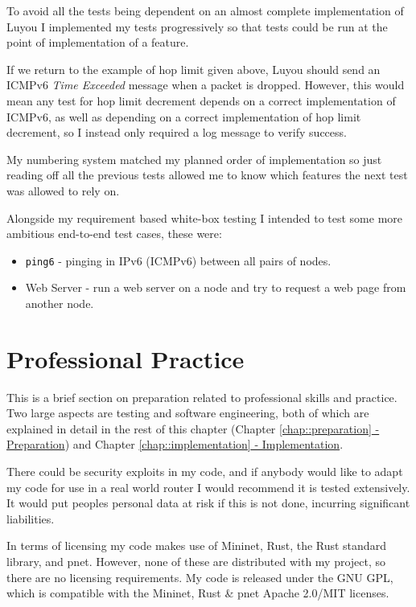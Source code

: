\documentclass[12pt,a4paper,twoside,openany]{report}
\begin{document}
\bigskip

To avoid all the tests being dependent on an almost complete implementation of Luyou I implemented my tests progressively so that tests could be run at the point of implementation of a feature. 

If we return to the example of hop limit given above, Luyou should send an ICMPv6 \textit{Time Exceeded} message when a packet is dropped.  However, this would mean any test for hop limit decrement depends on a correct implementation of ICMPv6, as well as depending on a correct implementation of hop limit decrement, so I instead only required a log message to verify success.  

My numbering system matched my planned order of implementation so just reading off all the previous tests allowed me to know which features the next test was allowed to rely on.  

\bigskip

Alongside my requirement based white-box testing I intended to test some more ambitious end-to-end test cases, these were:
\begin{itemize}
\item \verb!ping6! - pinging in IPv6 (ICMPv6) between all pairs of nodes.
\item Web Server - run a web server on a node and try to request a web page from another node.
\end{itemize}

\section{Professional Practice}
This is a brief section on preparation related to professional skills and practice.  Two large aspects are testing and software engineering, both of which are explained in detail in the rest of this chapter (Chapter \ref{chap::preparation}\hyperref[chap::preparation]{ - Preparation}) and Chapter \ref{chap::implementation}\hyperref[chap::implementation]{ - Implementation}.  

\bigskip

There could be security exploits in my code, and if anybody would like to adapt my code for use in a real world router I would recommend it is tested extensively.  It would put peoples personal data at risk if this is not done, incurring significant liabilities.

\bigskip

In terms of licensing my code makes use of Mininet, Rust, the Rust standard library, and pnet.  However, none of these are distributed with my project, so there are no licensing requirements. My code is released under the GNU GPL\cite{gpl}, which is compatible with the Mininet, Rust \& pnet Apache 2.0/MIT licenses.
\end{document}
